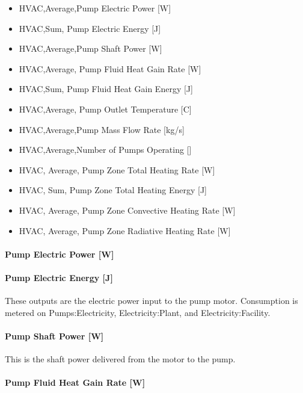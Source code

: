 \begin{itemize}
\item
  HVAC,Average,Pump Electric Power {[}W{]}
\item
  HVAC,Sum, Pump Electric Energy {[}J{]}
\item
  HVAC,Average,Pump Shaft Power {[}W{]}
\item
  HVAC,Average, Pump Fluid Heat Gain Rate {[}W{]}
\item
  HVAC,Sum, Pump Fluid Heat Gain Energy {[}J{]}
\item
  HVAC,Average, Pump Outlet Temperature {[}C{]}
\item
  HVAC,Average,Pump Mass Flow Rate {[}kg/s{]}
\item
  HVAC,Average,Number of Pumps Operating {[]}
\item
  HVAC, Average, Pump Zone Total Heating Rate {[}W{]}
\item
  HVAC, Sum, Pump Zone Total Heating Energy {[}J{]}
\item
  HVAC, Average, Pump Zone Convective Heating Rate {[}W{]}
\item
  HVAC, Average, Pump Zone Radiative Heating Rate {[}W{]}
\end{itemize}

\paragraph{Pump Electric Power {[}W{]}}\label{pump-electric-power-w-3}

\paragraph{Pump Electric Energy {[}J{]}}\label{pump-electric-energy-j-3}

These outputs are the electric power input to the pump motor. Consumption is metered on Pumps:Electricity, Electricity:Plant, and Electricity:Facility.

\paragraph{Pump Shaft Power {[}W{]}}\label{pump-shaft-power-w-3}

This is the shaft power delivered from the motor to the pump.

\paragraph{Pump Fluid Heat Gain Rate {[}W{]}}\label{pump-fluid-heat-gain-rate-w-3}

